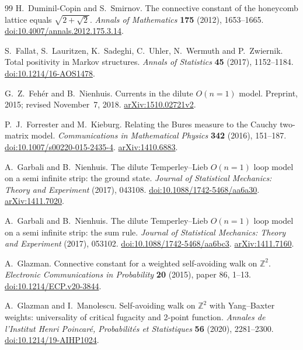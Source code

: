 \begin{thebibliography}{99}
H.~Duminil-Copin and S.~Smirnov.
The connective constant of the honeycomb lattice equals $\sqrt{2+\sqrt2}$.
\emph{Annals of Mathematics} \textbf{175} (2012), 1653--1665.
\href{https://doi.org/10.4007/annals.2012.175.3.14}{doi:10.4007/annals.2012.175.3.14}.

S.~Fallat, S.~Lauritzen, K.~Sadeghi, C.~Uhler, N.~Wermuth and P.~Zwiernik.
Total positivity in Markov structures.
\emph{Annals of Statistics} \textbf{45} (2017), 1152--1184.
\href{https://doi.org/10.1214/16-AOS1478}{doi:10.1214/16-AOS1478}.

G.~Z.~Feh\'er and B.~Nienhuis.
Currents in the dilute $O(n=1)$ model.
Preprint, 2015; revised November~7, 2018.
\href{https://arxiv.org/abs/1510.02721v2}{arXiv:1510.02721v2}.

P.~J.~Forrester and M.~Kieburg.
Relating the Bures measure to the Cauchy two-matrix model.
\emph{Communications in Mathematical Physics} \textbf{342} (2016), 151--187.
\href{https://doi.org/10.1007/s00220-015-2435-4}{doi:10.1007/s00220-015-2435-4}.
\href{https://arxiv.org/abs/1410.6883}{arXiv:1410.6883}.

A.~Garbali and B.~Nienhuis.
The dilute Temperley--Lieb $O(n=1)$ loop model on a semi infinite strip:
the ground state.
\emph{Journal of Statistical Mechanics: Theory and Experiment} (2017), 043108.
\href{https://doi.org/10.1088/1742-5468/aa6a30}{doi:10.1088/1742-5468/aa6a30}.
\href{https://arxiv.org/abs/1411.7020}{arXiv:1411.7020}.

A.~Garbali and B.~Nienhuis.
The dilute Temperley--Lieb $O(n=1)$ loop model on a semi infinite strip:
the sum rule.
\emph{Journal of Statistical Mechanics: Theory and Experiment} (2017), 053102.
\href{https://doi.org/10.1088/1742-5468/aa6bc3}{doi:10.1088/1742-5468/aa6bc3}.
\href{https://arxiv.org/abs/1411.7160}{arXiv:1411.7160}.

A.~Glazman.
Connective constant for a weighted self-avoiding walk on $\mathbb Z^2$.
\emph{Electronic Communications in Probability} \textbf{20} (2015), paper 86, 1--13.
\href{https://doi.org/10.1214/ECP.v20-3844}{doi:10.1214/ECP.v20-3844}.

A.~Glazman and I.~Manolescu.
Self-avoiding walk on $\mathbb Z^2$ with Yang--Baxter weights: universality of critical fugacity and 2-point function.
\emph{Annales de l'Institut Henri Poincar\'e, Probabilit\'es et Statistiques}
\textbf{56} (2020), 2281--2300.
\href{https://doi.org/10.1214/19-AIHP1024}{doi:10.1214/19-AIHP1024}.


\end{thebibliography}
